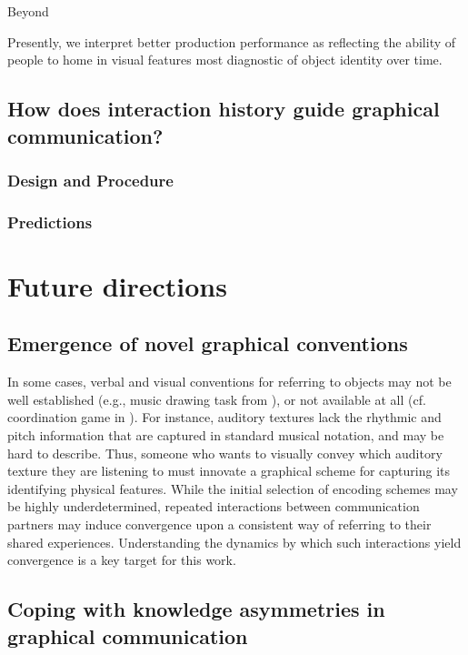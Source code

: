 \documentclass[12pt]{article}
\begin{document}
Beyond 



Presently, we interpret better production performance as reflecting the ability of people to home in visual features most diagnostic of object identity over time.


\subsection{How does interaction history guide graphical communication?}



\subsubsection{Design and Procedure}

\subsubsection{Predictions}

\section{Future directions}

\subsection{Emergence of novel graphical conventions}

In some cases, verbal and visual conventions for referring to objects may not be well established (e.g., music drawing task from ), or not available at all (cf. coordination game in ). For instance, auditory textures \cite{McDermott:2013ky} lack the rhythmic and pitch information that are captured in standard musical notation, and may be hard to describe. Thus, someone who wants to visually convey which auditory texture they are listening to must innovate a graphical scheme for capturing its identifying physical features. While the initial selection of encoding schemes may be highly underdetermined, repeated interactions between communication partners may induce convergence upon a consistent way of referring to their shared experiences. Understanding the dynamics by which such interactions yield convergence is a key target for this work. 

\subsection{Coping with knowledge asymmetries in graphical communication}
\end{document}
